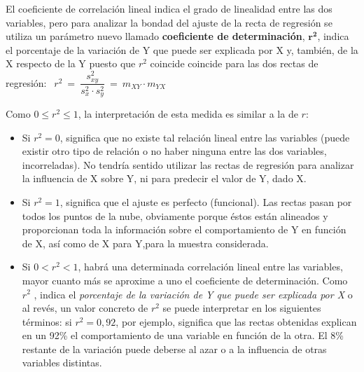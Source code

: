 \vspace{5mm} %
\begin{definition}
	
El coeficiente de correlación lineal indica el grado de linealidad entre las dos variables, pero para analizar la bondad del ajuste de la recta de regresión se utiliza un parámetro nuevo llamado \textbf{coeficiente de determinación}, $\boldsymbol{ r^2 }$, indica el porcentaje de la variación de Y que puede ser explicada por X y, también, de la X respecto de la Y puesto que $r^2$ coincide coincide para las dos rectas de regresión:
$\ \ r^2 \ = \ \dfrac{s_{xy}^2}{s_x^2\cdot s_y^2} \ = \ m_{XY}\cdot m_{YX}$

Como $0 \le r^2 \le  1$, la interpretación de esta medida es similar a la de $r$:

\begin{itemize}
\item Si $r^2 = 0$, significa que no existe tal relación lineal entre las variables (puede existir otro tipo de relación o no haber ninguna entre las dos variables, incorreladas). No tendría sentido utilizar las rectas de regresión para analizar la influencia de X sobre Y, ni para predecir el valor de Y, dado X.

\item Si $r^2 = 1$, significa que el ajuste es perfecto (funcional). Las rectas pasan por todos los puntos de la nube, obviamente porque éstos están alineados y proporcionan toda la información sobre el comportamiento de Y en función de X, así como de X para Y,para la muestra considerada.

\item Si $0 < r^2 < 1$, habrá una determinada correlación lineal entre las variables, mayor cuanto más se aproxime a uno el coeficiente de determinación. Como $r^2$ , indica el \emph{porcentaje de la variación de Y que puede ser explicada por X} o al revés, un valor concreto de $r^2$ se puede interpretar en los siguientes términos: si $r^2 =0,92$, por ejemplo,  significa que las rectas obtenidas explican en un 92\% el comportamiento de una variable en función de la otra. El 8\% restante de la variación puede deberse al azar o a la influencia  de otras variables distintas.
\end{itemize}

\end{definition}


	

